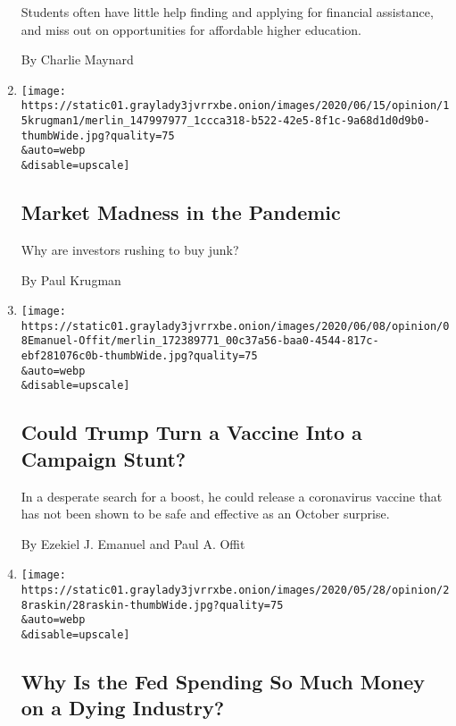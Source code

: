 \begin{enumerate}
  Students often have little help finding and applying for financial
  assistance, and miss out on opportunities for affordable higher
  education.

  By Charlie Maynard
\item
  \href{/2020/06/15/opinion/coronavirus-stock-market.html}{}

  \texttt{[image: https://static01.graylady3jvrrxbe.onion/images/2020/06/15/opinion/15krugman1/merlin\_147997977\_1ccca318-b522-42e5-8f1c-9a68d1d0d9b0-thumbWide.jpg?quality=75\\\&auto=webp\\\&disable=upscale]}

  \hypertarget{market-madness-in-the-pandemic}{%
  \subsection{Market Madness in the
  Pandemic}\label{market-madness-in-the-pandemic}}

  Why are investors rushing to buy junk?

  By Paul Krugman
\item
  \href{/2020/06/08/opinion/trump-coronavirus-vaccine.html}{}

  \texttt{[image: https://static01.graylady3jvrrxbe.onion/images/2020/06/08/opinion/08Emanuel-Offit/merlin\_172389771\_00c37a56-baa0-4544-817c-ebf281076c0b-thumbWide.jpg?quality=75\\\&auto=webp\\\&disable=upscale]}

  \hypertarget{could-trump-turn-a-vaccine-into-a-campaign-stunt}{%
  \subsection{Could Trump Turn a Vaccine Into a Campaign
  Stunt?}\label{could-trump-turn-a-vaccine-into-a-campaign-stunt}}

  In a desperate search for a boost, he could release a coronavirus
  vaccine that has not been shown to be safe and effective as an October
  surprise.

  By Ezekiel J. Emanuel and Paul A. Offit
\item
  \href{/2020/05/28/opinion/fed-fossil-fuels.html}{}

  \texttt{[image: https://static01.graylady3jvrrxbe.onion/images/2020/05/28/opinion/28raskin/28raskin-thumbWide.jpg?quality=75\\\&auto=webp\\\&disable=upscale]}

  \hypertarget{why-is-the-fed-spending-so-much-money-on-a-dying-industry}{%
  \subsection{Why Is the Fed Spending So Much Money on a Dying
  Industry?}\label{why-is-the-fed-spending-so-much-money-on-a-dying-industry}}


\end{enumerate}
